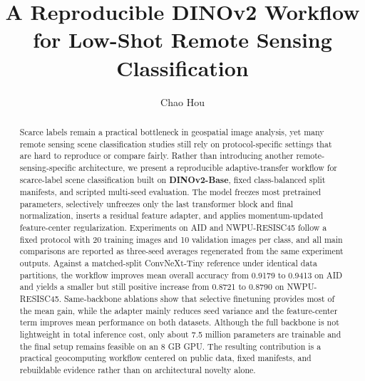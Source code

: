 \documentclass[a4paper,fleqn]{cas-sc}
\begin{document}
\let\WriteBookmarks\relax
\def\floatpagepagefraction{1}
\def\textpagefraction{.001}

\title[mode = title]{A Reproducible DINOv2 Workflow for Low-Shot Remote Sensing Classification}

\author[1]{Chao Hou}
\cormark[1]

\address[1]{School of Cybersecurity, Xi'an Polytechnic University, No. 19 Jinhua South Road, Xi'an 710048, Shaanxi, China}

\begin{abstract}
Scarce labels remain a practical bottleneck in geospatial image analysis, yet many remote sensing scene classification studies still rely on protocol-specific settings that are hard to reproduce or compare fairly. Rather than introducing another remote-sensing-specific architecture, we present a reproducible adaptive-transfer workflow for scarce-label scene classification built on \textbf{DINOv2-Base}, fixed class-balanced split manifests, and scripted multi-seed evaluation. The model freezes most pretrained parameters, selectively unfreezes only the last transformer block and final normalization, inserts a residual feature adapter, and applies momentum-updated feature-center regularization. Experiments on AID and NWPU-RESISC45 follow a fixed protocol with 20 training images and 10 validation images per class, and all main comparisons are reported as three-seed averages regenerated from the same experiment outputs. Against a matched-split ConvNeXt-Tiny reference under identical data partitions, the workflow improves mean overall accuracy from 0.9179 to 0.9413 on AID and yields a smaller but still positive increase from 0.8721 to 0.8790 on NWPU-RESISC45. Same-backbone ablations show that selective finetuning provides most of the mean gain, while the adapter mainly reduces seed variance and the feature-center term improves mean performance on both datasets. Although the full backbone is not lightweight in total inference cost, only about 7.5 million parameters are trainable and the final setup remains feasible on an 8 GB GPU. The resulting contribution is a practical geocomputing workflow centered on public data, fixed manifests, and rebuildable evidence rather than on architectural novelty alone.
\end{abstract}
\end{document}
